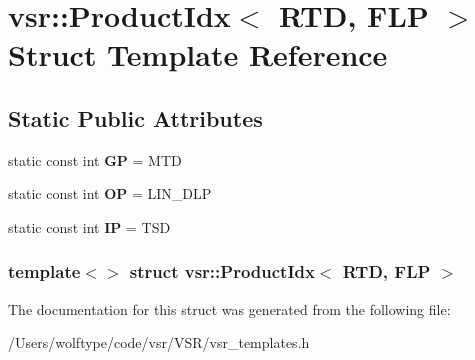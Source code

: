 \hypertarget{structvsr_1_1_product_idx_3_01_r_t_d_00_01_f_l_p_01_4}{\section{vsr\-:\-:Product\-Idx$<$ R\-T\-D, F\-L\-P $>$ Struct Template Reference}
\label{structvsr_1_1_product_idx_3_01_r_t_d_00_01_f_l_p_01_4}
}
\subsection*{Static Public Attributes}
\begin{DoxyCompactItemize}
\item 
\hypertarget{structvsr_1_1_product_idx_3_01_r_t_d_00_01_f_l_p_01_4_a8d013927c21fcf27c8230f9fdbd3867c}{static const int {\bfseries G\-P} = M\-T\-D}\label{structvsr_1_1_product_idx_3_01_r_t_d_00_01_f_l_p_01_4_a8d013927c21fcf27c8230f9fdbd3867c}

\item 
\hypertarget{structvsr_1_1_product_idx_3_01_r_t_d_00_01_f_l_p_01_4_a60a4d8c4d42b590a3c152ad9bc108a25}{static const int {\bfseries O\-P} = L\-I\-N\-\_\-\-D\-L\-P}\label{structvsr_1_1_product_idx_3_01_r_t_d_00_01_f_l_p_01_4_a60a4d8c4d42b590a3c152ad9bc108a25}

\item 
\hypertarget{structvsr_1_1_product_idx_3_01_r_t_d_00_01_f_l_p_01_4_af373da3749783b07dfceb6f6550686ec}{static const int {\bfseries I\-P} = T\-S\-D}\label{structvsr_1_1_product_idx_3_01_r_t_d_00_01_f_l_p_01_4_af373da3749783b07dfceb6f6550686ec}

\end{DoxyCompactItemize}
\subsubsection*{template$<$$>$ struct vsr\-::\-Product\-Idx$<$ R\-T\-D, F\-L\-P $>$}



The documentation for this struct was generated from the following file\-:\begin{DoxyCompactItemize}
\item 
/\-Users/wolftype/code/vsr/\-V\-S\-R/vsr\-\_\-templates.\-h\end{DoxyCompactItemize}

